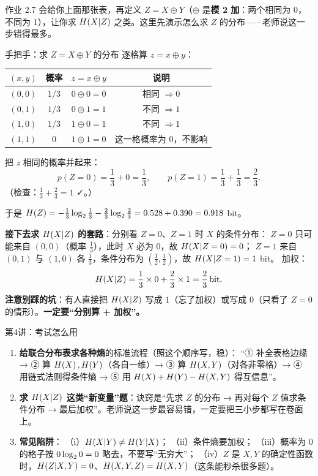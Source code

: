 作业 2.7 会给你上面那张表，再定义 $Z=X\oplus Y$（$\oplus$ 是\textbf{模 2 加}：两个相同为 0，不同为 1），让你求 $H\!\left(X|Z\right)$ 之类。这里先演示怎么求 $Z$ 的分布——老师说这一步错得最多。

\begin{calc}{手把手：求 $Z=X\oplus Y$ 的分布}
逐格算 $z=x\oplus y$：
\begin{center}
\renewcommand{\arraystretch}{1.3}
\begin{tabular}{c|c|c|c}
\toprule
$(x,y)$ & 概率 & $z=x\oplus y$ & 说明\\
\midrule
$(0,0)$ & $1/3$ & $0\oplus0=0$ & 相同 $\Rightarrow0$\\
$(0,1)$ & $1/3$ & $0\oplus1=1$ & 不同 $\Rightarrow1$\\
$(1,0)$ & $1/3$ & $1\oplus0=1$ & 不同 $\Rightarrow1$\\
$(1,1)$ & $0$ & $1\oplus1=0$ & 这一格概率为 0，不影响\\
\bottomrule
\end{tabular}
\end{center}
把 $z$ 相同的概率并起来：
\[
p(Z=0)=\frac13+0=\frac13,\qquad p(Z=1)=\frac13+\frac13=\frac23 .
\]
（检查：$\frac13+\frac23=1$ ✓。）

于是 $H\!\left(Z\right)=-\frac13\log_{2}\frac13-\frac23\log_{2}\frac23=0.528+0.390=0.918$ bit。

\textbf{接下去求 $H\!\left(X|Z\right)$ 的套路}：分别看 $Z=0$、$Z=1$ 时 $X$ 的条件分布：
$Z=0$ 只可能来自 $(0,0)$（概率 $\frac13$），此时 $X$ 必为 0，故 $H\!\left(X|Z=0\right)=0$；
$Z=1$ 来自 $(0,1)$ 与 $(1,0)$ 各 $\frac13$，条件分布为 $(\frac12,\frac12)$，故 $H\!\left(X|Z=1\right)=1$ bit。
加权：
\[
H\!\left(X|Z\right)=\frac13\times0+\frac23\times1=\frac23\,\text{bit} .
\]
\textbf{注意别踩的坑}：有人直接把 $H\!\left(X|Z\right)$ 写成 $1$（忘了加权）或写成 $0$（只看了 $Z=0$ 的情形）。\textbf{一定要“分别算 + 加权”。}
\end{calc}

\begin{exam}{第4讲：考试怎么用}
\begin{enumerate}[leftmargin=1.6em,itemsep=1pt,topsep=2pt]
  \item \textbf{给联合分布表求各种熵}的标准流程（照这个顺序写，稳）：
        “① 补全表格边缘 → ② 算 $H\!\left(X\right),H\!\left(Y\right)$（各自一维）→ ③ 算 $H\!\left(X,Y\right)$（对各非零格）→ ④ 用链式法则得条件熵 → ⑤ 用 $H\!\left(X\right)+H\!\left(Y\right)-H\!\left(X,Y\right)$ 得互信息”。
  \item \textbf{求 $H\!\left(X|Z\right)$ 这类“新变量”题}：诀窍是“先求 $Z$ 的分布 → 再对每个 $Z$ 值求条件分布 → 最后加权”。老师说这一步最容易错，一定要把三小步都写在卷面上。
  \item \textbf{常见陷阱}：
        （i）$H\!\left(X|Y\right)\ne H\!\left(Y|X\right)$；
        （ii）条件熵要加权；
        （iii）概率为 0 的格子按 $0\log_{2}0=0$ 略去，不要写“无穷大”；
        （iv）$Z$ 是 $X,Y$ 的确定性函数时，$H\!\left(Z|X,Y\right)=0$、$H\!\left(X,Y,Z\right)=H\!\left(X,Y\right)$（这条能秒杀很多题）。
\end{enumerate}
\end{exam}

